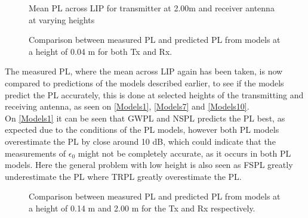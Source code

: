 \begin{figure}[!htbp]
\centering

\caption{Mean PL across LIP for transmitter at 2.00m and receiver antenna at varying heights}
\label{Meas3}
\end{figure}




\begin{figure}[H]
\centering

\caption{Comparison between measured PL and predicted PL from models at a height of 0.04 m for both Tx and Rx.}
\label{Models1}
\end{figure}

The measured PL, where the mean across LIP again has been taken, is now compared to predictions of the models described earlier, to see if the models predict the PL accurately, this is done at selected heights of the transmitting and receiving antenna, as seen on \autoref{Models1}, \autoref{Models7} and \autoref{Models10}.\\




On \autoref{Models1} it can be seen that GWPL and NSPL predicts the PL best, as expected due to the conditions of the PL models, however both PL models overestimate the PL by close around 10 dB, which could indicate that the measurements of $\epsilon_0$ might not be completely accurate, as it occurs in both PL models. Here the general problem with low height is also seen as FSPL greatly underestimate the PL where TRPL greatly overestimate the PL.

\begin{figure}[H]
\centering

\caption{Comparison between measured PL and predicted PL from models at a height of 0.14 m and 2.00 m for the Tx and Rx respectively.}
\label{Models7}
\end{figure}

